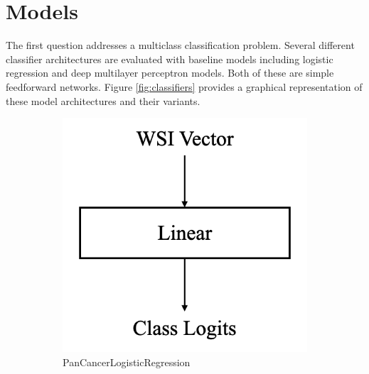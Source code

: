 \documentclass{l4proj}
\begin{document}
\section{Models} \label{sec:WSImodel}
The first question addresses a multiclass classification problem. Several different classifier architectures are evaluated with baseline models including logistic regression and deep multilayer perceptron models. Both of these are simple feedforward networks. Figure \ref{fig:classifiers} provides a graphical representation of these model architectures and their variants.

\begin{figure}[] 
    \centering
    \begin{subfigure}[b]{0.3\textwidth}
        \includegraphics[width=\textwidth]{images/logreg.png}
        \caption{PanCancerLogisticRegression}
        \label{fig:logisticregression}
    \end{subfigure}
    \quad
    \begin{subfigure}[b]{0.3\textwidth}

\end{subfigure}
\end{figure}
\end{document}
